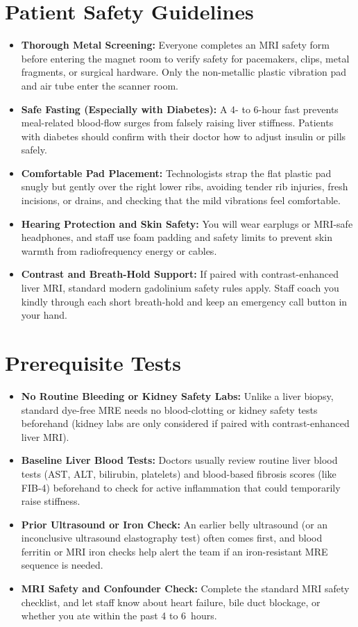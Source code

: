 \section{Patient Safety Guidelines}
\begin{itemize}
\item \textbf{Thorough Metal Screening:} Everyone completes an MRI safety form before entering the magnet room to verify safety for pacemakers, clips, metal fragments, or surgical hardware. Only the non-metallic plastic vibration pad and air tube enter the scanner room.
\item \textbf{Safe Fasting (Especially with Diabetes):} A 4- to 6-hour fast prevents meal-related blood-flow surges from falsely raising liver stiffness. Patients with diabetes should confirm with their doctor how to adjust insulin or pills safely.
\item \textbf{Comfortable Pad Placement:} Technologists strap the flat plastic pad snugly but gently over the right lower ribs, avoiding tender rib injuries, fresh incisions, or drains, and checking that the mild vibrations feel comfortable.
\item \textbf{Hearing Protection and Skin Safety:} You will wear earplugs or MRI-safe headphones, and staff use foam padding and safety limits to prevent skin warmth from radiofrequency energy or cables.
\item \textbf{Contrast and Breath-Hold Support:} If paired with contrast-enhanced liver MRI, standard modern gadolinium safety rules apply. Staff coach you kindly through each short breath-hold and keep an emergency call button in your hand.
\end{itemize}

\section{Prerequisite Tests}
\begin{itemize}
\item \textbf{No Routine Bleeding or Kidney Safety Labs:} Unlike a liver biopsy, standard dye-free MRE needs no blood-clotting or kidney safety tests beforehand (kidney labs are only considered if paired with contrast-enhanced liver MRI).
\item \textbf{Baseline Liver Blood Tests:} Doctors usually review routine liver blood tests (AST, ALT, bilirubin, platelets) and blood-based fibrosis scores (like FIB-4) beforehand to check for active inflammation that could temporarily raise stiffness.
\item \textbf{Prior Ultrasound or Iron Check:} An earlier belly ultrasound (or an inconclusive ultrasound elastography test) often comes first, and blood ferritin or MRI iron checks help alert the team if an iron-resistant MRE sequence is needed.
\item \textbf{MRI Safety and Confounder Check:} Complete the standard MRI safety checklist, and let staff know about heart failure, bile duct blockage, or whether you ate within the past 4 to 6~hours.
\end{itemize}

